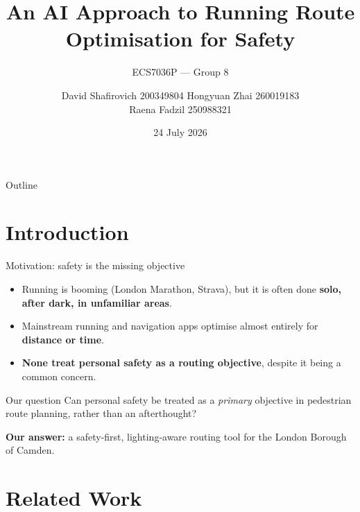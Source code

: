 \documentclass{beamer}
\title[NightRunner]{An AI Approach to Running Route Optimisation for Safety}
\subtitle{ECS7036P --- Group 8}
\author[Group 8]{David Shafirovich 200349804 \quad Hongyuan Zhai 260019183 \\ Raena Fadzil 250988321}
\institute[QMUL]{Queen Mary University of London}
\date{24 July 2026}
\begin{document}
\begin{frame}
  \titlepage
\end{frame}

\begin{frame}{Outline}
  \tableofcontents
\end{frame}

\section{Introduction}

\begin{frame}{Motivation: safety is the missing objective}
  \begin{itemize}
    \item Running is booming (London Marathon, Strava), but it is often done \textbf{solo, after dark, in unfamiliar areas}.
    \item Mainstream running and navigation apps optimise almost entirely for \textbf{distance or time}.
    \item \textbf{None treat personal safety as a routing objective}, despite it being a common concern.
  \end{itemize}
  \vspace{0.5em}
  \begin{block}{Our question}
    Can personal safety be treated as a \emph{primary} objective in pedestrian route planning, rather than an afterthought?
  \end{block}
  \vspace{0.3em}
  \textbf{Our answer:} a safety-first, lighting-aware routing tool for the London Borough of Camden.
\end{frame}

\section{Related Work}
\end{document}
